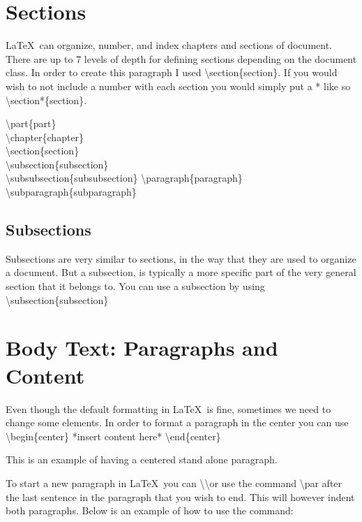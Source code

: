 \documentclass[12pt,journal,compsoc]{IEEEtran}
\begin{document}
\section{Sections}
\LaTeX\ can organize, number, and index chapters and sections of document. There are up to 7 levels of depth for defining sections depending on the document class. In order to create this paragraph I used \textbackslash{section\{section\}}. If you would wish to not include a number with each section you would simply put a * like so \textbackslash{section*\{section\}}.

\begin{center}
    \textbackslash{part\{part\}} \\
    \textbackslash{chapter\{chapter\}} \\
    \textbackslash{section\{section\}} \\
    \textbackslash{subsection\{subsection\}} \\
    \textbackslash{subsubsection\{subsubsection\}}
    \textbackslash{paragraph\{paragraph\}}
    \textbackslash{subparagraph\{subparagraph\}}

\end{center}

\subsection{Subsections}
Subsections are very similar to sections, in the way that they are used to organize a document. But a subsection, is typically a more specific part of the very general section that it belongs to. You can use a subsection by using \textbackslash{subsection\{subsection\}}

\section{Body Text: Paragraphs and Content}
Even though the default formatting in \LaTeX\ is fine, sometimes we need to change some elements. In order to format a paragraph in the center you can use \textbackslash{begin\{center\}}  *insert content here* \textbackslash{end\{center\}}

\begin{center}
    This is an example of having a centered stand alone paragraph.
\end{center}
To start a new paragraph in \LaTeX\, you can \textbackslash \textbackslash or use the command \textbackslash{par} after the last sentence in the paragraph that you wish to end. This will however indent both paragraphs. Below is an example of how to use the command: \\
\end{document}
